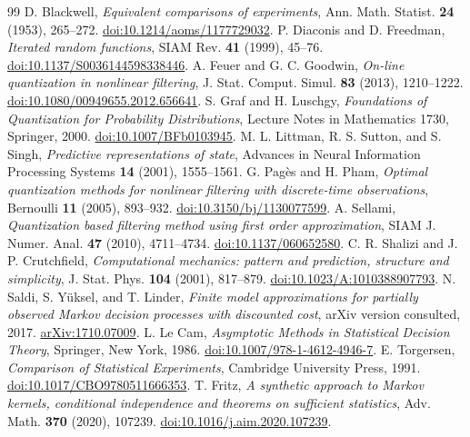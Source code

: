\begin{thebibliography}{99}
 D. Blackwell, \emph{Equivalent comparisons of experiments}, Ann. Math. Statist. \textbf{24} (1953), 265--272. \href{https://doi.org/10.1214/aoms/1177729032}{doi:10.1214/aoms/1177729032}.
 P. Diaconis and D. Freedman, \emph{Iterated random functions}, SIAM Rev. \textbf{41} (1999), 45--76. \href{https://doi.org/10.1137/S0036144598338446}{doi:10.1137/S0036144598338446}.
 A. Feuer and G. C. Goodwin, \emph{On-line quantization in nonlinear filtering}, J. Stat. Comput. Simul. \textbf{83} (2013), 1210--1222. \href{https://doi.org/10.1080/00949655.2012.656641}{doi:10.1080/00949655.2012.656641}.
 S. Graf and H. Luschgy, \emph{Foundations of Quantization for Probability Distributions}, Lecture Notes in Mathematics 1730, Springer, 2000. \href{https://doi.org/10.1007/BFb0103945}{doi:10.1007/BFb0103945}.
 M. L. Littman, R. S. Sutton, and S. Singh, \emph{Predictive representations of state}, Advances in Neural Information Processing Systems \textbf{14} (2001), 1555--1561.
 G. Pag\`es and H. Pham, \emph{Optimal quantization methods for nonlinear filtering with discrete-time observations}, Bernoulli \textbf{11} (2005), 893--932. \href{https://doi.org/10.3150/bj/1130077599}{doi:10.3150/bj/1130077599}.
 A. Sellami, \emph{Quantization based filtering method using first order approximation}, SIAM J. Numer. Anal. \textbf{47} (2010), 4711--4734. \href{https://doi.org/10.1137/060652580}{doi:10.1137/060652580}.
 C. R. Shalizi and J. P. Crutchfield, \emph{Computational mechanics: pattern and prediction, structure and simplicity}, J. Stat. Phys. \textbf{104} (2001), 817--879. \href{https://doi.org/10.1023/A:1010388907793}{doi:10.1023/A:1010388907793}.
 N. Saldi, S. Y\"uksel, and T. Linder, \emph{Finite model approximations for partially observed Markov decision processes with discounted cost}, arXiv version consulted, 2017. \href{https://arxiv.org/abs/1710.07009}{arXiv:1710.07009}.
 L. Le Cam, \emph{Asymptotic Methods in Statistical Decision Theory}, Springer, New York, 1986. \href{https://doi.org/10.1007/978-1-4612-4946-7}{doi:10.1007/978-1-4612-4946-7}.
 E. Torgersen, \emph{Comparison of Statistical Experiments}, Cambridge University Press, 1991. \href{https://doi.org/10.1017/CBO9780511666353}{doi:10.1017/CBO9780511666353}.
 T. Fritz, \emph{A synthetic approach to Markov kernels, conditional independence and theorems on sufficient statistics}, Adv. Math. \textbf{370} (2020), 107239. \href{https://doi.org/10.1016/j.aim.2020.107239}{doi:10.1016/j.aim.2020.107239}.

\end{thebibliography}
